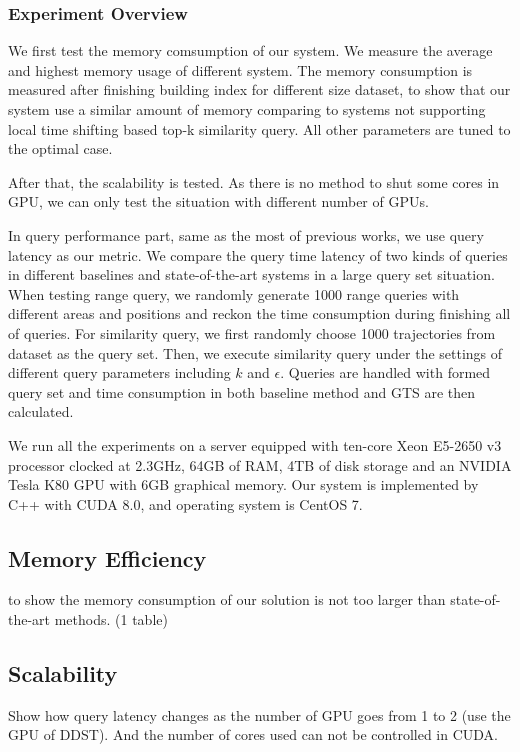 \documentclass[conference]{IEEEtran}
\begin{document}
\subsubsection{Experiment Overview}

We first test the memory comsumption of our system. We measure the average and highest memory usage of different system. The memory consumption is measured after finishing building index for different size dataset, to show that our system use a similar amount of memory comparing to systems not supporting local time shifting based top-k similarity query. All other parameters are tuned to the optimal case.

After that, the scalability is tested. As there is no method to shut some cores in GPU, we can only test the situation with different number of GPUs.

In query performance part, same as the most of previous works, we use query latency as our metric. We compare the query time latency of two kinds of queries in different baselines and state-of-the-art systems in a large query set situation. When testing range query, we randomly generate 1000 range queries with different areas and positions and reckon the time consumption during finishing all of queries. For similarity query, we first randomly choose 1000 trajectories from dataset as the query set. Then, we execute similarity query under the settings of different query parameters including $k$ and $\epsilon$. Queries are handled with formed query set and time consumption in both baseline method and GTS are then calculated. 


We run all the experiments on a server equipped with ten-core Xeon E5-2650 v3 processor clocked at 2.3GHz, 64GB of RAM, 4TB of disk storage and an NVIDIA Tesla K80 GPU with 6GB graphical memory. Our system is implemented by C++ with CUDA 8.0, and operating system is CentOS 7.



\subsection{Memory Efficiency}
to show the memory consumption of our solution is not too larger than state-of-the-art methods.
(1 table)


\subsection{Scalability}
Show how query latency changes as the number of GPU goes from 1 to 2 (use the GPU of DDST). And the number of cores used can not be controlled in CUDA. 
\end{document}
